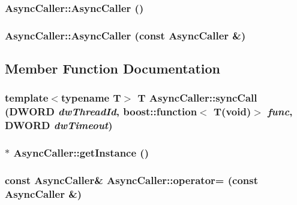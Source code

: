 \subsubsection{\setlength{\rightskip}{0pt plus 5cm}Async\-Caller::Async\-Caller ()\hspace{0.3cm}{\tt  [private]}}\label{class_async_caller_e4ab3960e98178b7605dac44196818a9}


\subsubsection{\setlength{\rightskip}{0pt plus 5cm}Async\-Caller::Async\-Caller (const {\bf Async\-Caller} \&)\hspace{0.3cm}{\tt  [private]}}\label{class_async_caller_aadb352c8644de74f3b8f0a64aae73f5}




\subsection{Member Function Documentation}
\subsubsection{\setlength{\rightskip}{0pt plus 5cm}template$<$typename T$>$ T Async\-Caller::sync\-Call (DWORD {\em dw\-Thread\-Id}, boost::function$<$ T(void)$>$ {\em func}, DWORD {\em dw\-Timeout})\hspace{0.3cm}{\tt  [inline]}}\label{class_async_caller_122481379f859397e7005a18eb9de0cb}


\subsubsection{ $\ast$ Async\-Caller::get\-Instance ()\hspace{0.3cm}{\tt  [static]}}\label{class_async_caller_50d891b4b27f59fade463127276a188f}


\subsubsection{\setlength{\rightskip}{0pt plus 5cm}const {\bf Async\-Caller}\& Async\-Caller::operator= (const {\bf Async\-Caller} \&)\hspace{0.3cm}{\tt  [private]}}\label{class_async_caller_67590e47a82ff258bfd9dafb71de0ca3}


